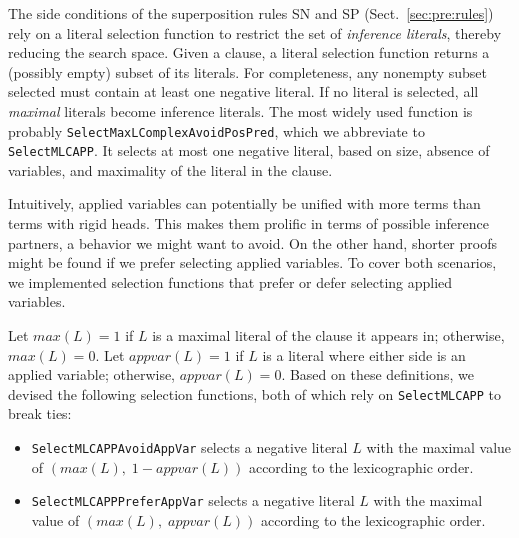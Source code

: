 

The side conditions of the superposition rules SN and SP
(Sect.~\ref{sec:pre:rules}) rely on a literal
selection function to restrict the set of \emph{inference literals},
thereby reducing the search space. Given a clause, a literal selection
function returns a (possibly empty) subset of its literals. For
completeness, any nonempty subset selected must contain at least
one negative literal. If no literal is selected, all \emph{maximal}
literals become inference literals.
The most widely used function is probably
\texttt{SelectMaxLComplexAvoidPosPred}, which we abbreviate to
\texttt{SelectMLCAPP}. It selects at most one negative literal, based
on size, absence of variables, and maximality of the literal in the clause.

\begin{rep}
  Intuitively, applied variables can potentially be unified with more terms than
  terms with rigid heads. This makes them prolific in terms of possible
  inference partners, a behavior we might want to avoid. On the other hand, shorter proofs
  might be found if we prefer selecting applied variables. To cover both
  scenarios, we implemented selection functions that prefer or defer selecting
  applied variables. %
  
  Let $\mathit{max}(L)=1$ if $L$ is a maximal literal of the clause it appears
  in; otherwise, $\mathit{max}(L) = 0$. Let $\mathit{appvar(L)} = 1$ if $L$ is a
  literal where either side is an applied variable; otherwise,
  $\mathit{appvar(L)} = 0$. Based on these definitions, we devised the following
  selection functions, both of which rely on \texttt{SelectMLCAPP} to break
  ties:
  \begin{itemize}
  \item \texttt{SelectMLCAPPAvoidAppVar} selects a negative literal $L$ with
    the maximal value of $(\mathit{max}(L){,}\; 1-\mathit{appvar}(L))$
    according to the lexicographic order.
  
  \smallskip
  \item \texttt{SelectMLCAPPPreferAppVar} selects a negative literal $L$ with the
    maximal value of $(\mathit{max}(L){,}\; \mathit{appvar}(L))$
    according to the lexicographic order.
  \end{itemize}
  \end{rep}

